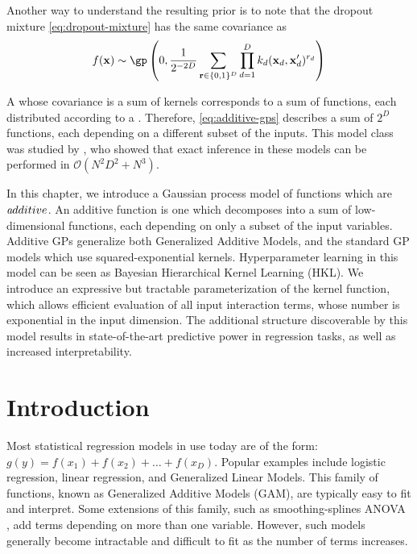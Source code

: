Another way to understand the resulting prior is to note that the dropout mixture \eqref{eq:dropout-mixture} has the same covariance as
\begin{align}
f(\vx) \sim \textnormal{\gp} \left(0, \frac{1}{2^{-2D}} \sum_{\vr \in \{0,1\}^D}  \prod_{d=1}^D k_d(\vx_d, \vx_d')^{r_d} \right)
\label{eq:additive-gps}
\end{align}

A \gp{} whose covariance is a sum of kernels corresponds to a sum of functions, each distributed according to a \gp{}.  Therefore, \eqref{eq:additive-gps} describes a sum of $2^D$ functions, each depending on a different subset of the inputs.
This model class was studied by \citet{duvenaud2011additive11}, who showed that exact inference in these models can be performed in $\mathcal{O}(N^2 D^2 + N^3)$.



In this chapter, we introduce a Gaussian process model of functions which are $\textit additive$.  An additive function is one which decomposes into a sum of low-dimensional functions, each depending on only a subset of the input variables. Additive GPs generalize both Generalized Additive Models, and the standard GP models which use squared-exponential kernels.  Hyperparameter learning in this model can be seen as Bayesian Hierarchical Kernel Learning (HKL).  We introduce an expressive but tractable parameterization of the kernel function, which allows efficient evaluation of all input interaction terms, whose number is exponential in the input dimension.  The additional structure discoverable by this model results in state-of-the-art predictive power in regression tasks, as well as increased interpretability.

\section{Introduction}
Most statistical regression models in use today are of the form: $g(y) = f(x_1) + f(x_2) + \dots + f(x_D)$.  Popular examples include logistic regression, linear regression, and Generalized Linear Models\cite{nelder1972generalized}.  This family of functions, known as Generalized Additive Models (GAM)\cite{hastie1990generalized}, are typically easy to fit and interpret.   Some extensions of this family, such as smoothing-splines ANOVA \cite{wahba1990spline}, add terms depending on more than one variable.  However, such models generally become intractable and difficult to fit as the number of terms increases.

